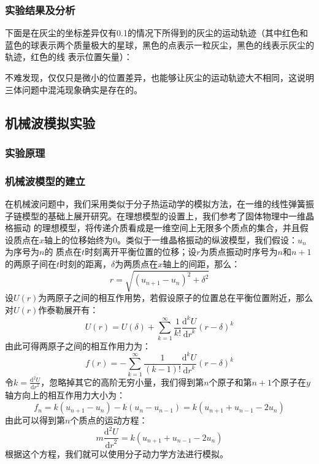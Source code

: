 ﻿\documentclass{article}
\begin{document}
	\subsubsection{实验结果及分析}
	下面是在灰尘的坐标差异仅有0.1的情况下所得到的灰尘的运动轨迹（其中红色和蓝色的球表示两个质量极大的星球，黑色的点表示一粒灰尘，黑色的线表示灰尘的轨迹，红色的线
	表示位置矢量）：
	\begin{figure}[H]
		\centering
	\end{figure}
	\begin{figure}[H]
		\centering
	\end{figure}
	不难发现，仅仅只是微小的位置差异，也能够让灰尘的运动轨迹大不相同，这说明三体问题中混沌现象确实是存在的。
	\subsection{机械波模拟实验}
	\subsubsection{实验原理}
	\subsubsection*{机械波模型的建立}
	在机械波问题中，我们采用类似于分子热运动学的模拟方法，在一维的线性弹簧振子链模型的基础上展开研究。在理想模型的设置上，我们参考了固体物理中一维晶格振动
	的理想模型，将传递介质看成是一维空间上无限多个质点的集合，并且假设质点在$x$轴上的位移始终为0。类似于一维晶格振动的纵波模型，我们假设：$u_n$为序号为$n$的
	质点在$t$时刻离开平衡位置的位移；设$r$为质点振动时序号为$n$和$n+1$的两原子间在$t$时刻的距离，$\delta$为两质点在$x$轴上的间距，那么：
	\[r=\sqrt{(u_{n+1} - u_n)^2+\delta^2}\]
	设$U(r)$为两原子之间的相互作用势，若假设原子的位置总在平衡位置附近，那么对$U(r)$作泰勒展开有：
	\[U(r) = U(\delta)+\sum_{k = 1}^{\infty} \frac{1}{k!}\frac{\mathrm{d}^kU}{{\mathrm{d}r}^k}(r-\delta)^k\]
	由此可得两原子之间的相互作用力为：
	\[f(r) = -\sum_{k = 1}^{\infty}\frac{1}{(k-1)!}\frac{\mathrm{d}^kU}{{\mathrm{d}r}^k}(r-\delta)^k\]
	令$\displaystyle k=\frac{\mathrm{d}^2U}{{\mathrm{d}r}^2}$，忽略掉其它的高阶无穷小量，我们得到第$n$个原子和第$n+1$个原子在$y$轴方向上的相互作用力大小为：
	\[f_n=k(u_{n+1}-u_n)-k(u_n-u_{n-1})=k(u_{n+1}+u_{n-1}-2u_n)\]
	由此可以得到第$n$个质点的运动方程：
	\[m\frac{\mathrm{d}^2U}{{\mathrm{d}r}^2}=k(u_{n+1}+u_{n-1}-2u_n)\]
	根据这个方程，我们就可以使用分子动力学方法进行模拟。
\end{document}
